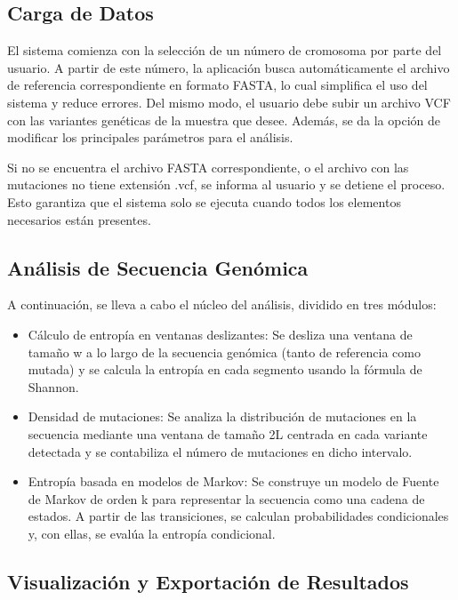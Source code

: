 \documentclass[11pt,spanish,listoffigures,listoftables]{tfgetsinf}
\begin{document}
\subsection{Carga de Datos}

El sistema comienza con la selección de un número de cromosoma por parte del usuario. A partir de este número, la aplicación busca automáticamente el archivo de referencia correspondiente en formato \acs{FASTA}, lo cual simplifica el uso del sistema y reduce errores. Del mismo modo, el usuario debe subir un archivo \acs{VCF} con las variantes genéticas de la muestra que desee. Además, se da la opción de modificar los principales parámetros para el análisis. 

Si no se encuentra el archivo \acs{FASTA} correspondiente, o el archivo con las mutaciones no tiene extensión .vcf, se informa al usuario y se detiene el proceso. Esto garantiza que el sistema solo se ejecuta cuando todos los elementos necesarios están presentes. 

\subsection{Análisis de Secuencia Genómica}

A continuación, se lleva a cabo el núcleo del análisis, dividido en tres módulos: 


\begin{itemize}
   \item Cálculo de entropía en ventanas deslizantes: Se desliza una ventana de tamaño w a lo largo de la secuencia genómica (tanto de referencia como mutada) y se calcula la entropía en cada segmento usando la fórmula de Shannon. 
   \item Densidad de mutaciones: Se analiza la distribución de mutaciones en la secuencia mediante una ventana de tamaño 2L centrada en cada variante detectada y se contabiliza el número de mutaciones en dicho intervalo. 
   \item Entropía basada en modelos de Markov: Se construye un modelo de Fuente de Markov de orden k para representar la secuencia como una cadena de estados. A partir de las transiciones, se calculan probabilidades condicionales y, con ellas, se evalúa la entropía condicional. 
\end{itemize}

\subsection{Visualización y Exportación de Resultados }
\end{document}
